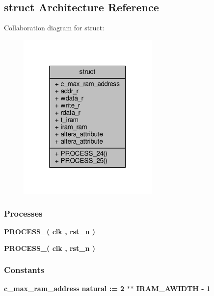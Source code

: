 \subsection{struct Architecture Reference}
\label{classddr2__phy__alt__mem__phy__iram__ram_1_1struct}


Collaboration diagram for struct\+:\nopagebreak
\begin{figure}[H]
\begin{center}
\leavevmode
\includegraphics[width=196pt]{df/d59/classddr2__phy__alt__mem__phy__iram__ram_1_1struct__coll__graph}
\end{center}
\end{figure}
\subsubsection*{Processes}
 \begin{DoxyCompactItemize}
\item 
{\bf P\+R\+O\+C\+E\+S\+S\+\_}{\bfseries  ( {\bfseries {\bfseries {\bf clk}} \textcolor{vhdlchar}{ }} , {\bfseries {\bfseries {\bf rst\+\_\+n}} \textcolor{vhdlchar}{ }} )}
\item 
{\bf P\+R\+O\+C\+E\+S\+S\+\_}{\bfseries  ( {\bfseries {\bfseries {\bf clk}} \textcolor{vhdlchar}{ }} , {\bfseries {\bfseries {\bf rst\+\_\+n}} \textcolor{vhdlchar}{ }} )}
\end{DoxyCompactItemize}
\subsubsection*{Constants}
 \begin{DoxyCompactItemize}
\item 
{\bf c\+\_\+max\+\_\+ram\+\_\+address} {\bfseries \textcolor{comment}{natural}\textcolor{vhdlchar}{ }\textcolor{vhdlchar}{ }\textcolor{vhdlchar}{\+:}\textcolor{vhdlchar}{=}\textcolor{vhdlchar}{ }\textcolor{vhdlchar}{ } \textcolor{vhdldigit}{2} \textcolor{vhdlchar}{$\ast$}\textcolor{vhdlchar}{$\ast$}\textcolor{vhdlchar}{ }\textcolor{vhdlchar}{ }\textcolor{vhdlchar}{ }{\bfseries {\bf I\+R\+A\+M\+\_\+\+A\+W\+I\+D\+TH}} \textcolor{vhdlchar}{-\/}\textcolor{vhdlchar}{ } \textcolor{vhdldigit}{1} \textcolor{vhdlchar}{ }} 
\end{DoxyCompactItemize}
